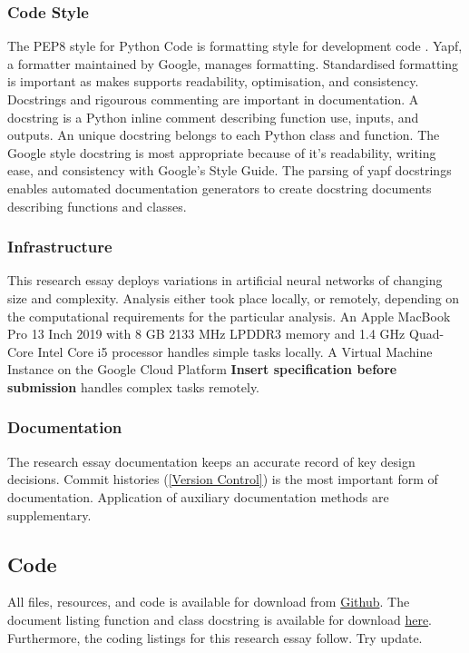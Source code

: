\documentclass[12pt]{article}
\begin{document}
\subsubsection{Code Style} \label{CS}
The PEP8 style for Python Code is formatting style for development code \cite{PEP8}. 
Yapf, a formatter maintained by Google, manages formatting.
Standardised formatting is important as makes supports readability, optimisation, and consistency.
Docstrings and rigourous commenting are important in documentation. 
A docstring is a Python inline comment describing function use, inputs, and outputs.
An unique docstring belongs to each Python class and function. 
The Google style docstring is most appropriate because of it's readability, writing ease, and consistency with Google's Style Guide.
The parsing of yapf docstrings enables automated documentation generators to create docstring documents describing functions and classes.

\subsubsection{Infrastructure}
This research essay deploys variations in artificial neural networks of changing size and complexity.
Analysis either took place locally, or remotely, depending on the computational requirements for the particular analysis.
An Apple MacBook Pro 13 Inch 2019 with 8 GB 2133 MHz LPDDR3 memory and 1.4 GHz Quad-Core Intel Core i5 processor handles simple tasks locally.
A Virtual Machine Instance on the Google Cloud Platform \textbf{Insert specification before submission} handles complex tasks remotely.

\subsubsection{Documentation}
The research essay documentation keeps an accurate record of key design decisions.
Commit histories (\ref{Version Control}) is the most important form of documentation.
Application of auxiliary documentation methods are supplementary.
\subsection{Code} \label{code}
All files, resources, and code is available for download from \href{https://github.com/CMCD1996/finance-honours}{Github}.
The document listing function and class docstring is available for download \href{/Users/connor/Google Drive/Documents/Professional/Projects/Portfolio/downloads/wip.pdf}{here}.
Furthermore, the coding listings for this research essay follow. Try update.
% 
\end{document}
